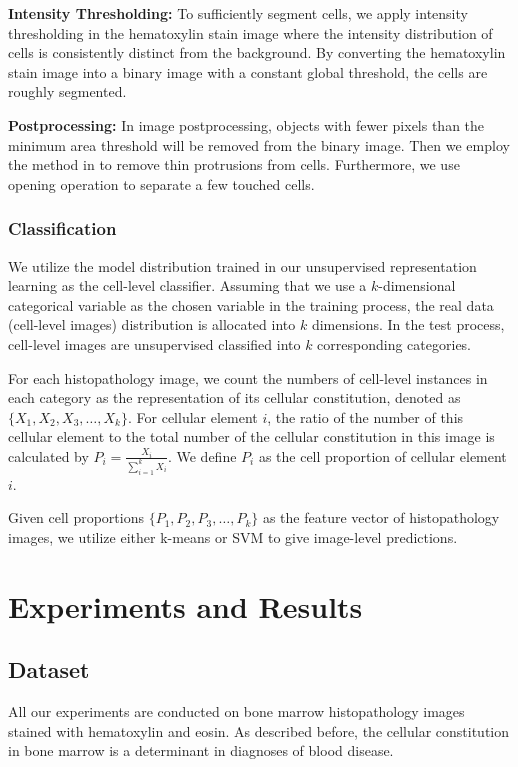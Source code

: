 \documentclass[journal]{IEEEtran}
\begin{document}
\textbf{Intensity Thresholding:} To sufficiently segment cells, we apply intensity thresholding in the hematoxylin stain image where the intensity distribution of cells is consistently distinct from the background. By converting the hematoxylin stain image into a binary image with a constant global threshold, the cells are roughly segmented.

\textbf{Postprocessing:} In image postprocessing, objects with fewer pixels than the minimum area threshold will be removed from the binary image. Then we employ the method in \cite{Wienert2012Detection} to remove thin protrusions from cells. Furthermore, we use opening operation to separate a few touched cells.

\subsubsection{Classification}
We utilize the model distribution trained in our unsupervised representation learning as the cell-level classifier. Assuming that we use a $k$-dimensional categorical variable as the chosen variable in the training process, the real data (cell-level images) distribution is allocated into $k$ dimensions. In the test process, cell-level images are unsupervised classified into $k$ corresponding categories.

For each histopathology image, we count the numbers of cell-level instances in each category as the representation of its cellular constitution, denoted as $\{X_1, X_2, X_3, \ldots, X_k\}$. For cellular element $i$, the ratio of the number of this cellular element to the total number of the cellular constitution in this image is calculated by $P_i=\frac{X_i}{\sum_{i=1}^{k}{X_i}}$. We define $P_i$ as the cell proportion of cellular element $i$.

Given cell proportions $\{P_1, P_2, P_3, \ldots, P_k\}$ as the feature vector of histopathology images, we utilize either k-means or SVM to give image-level predictions.

\section{Experiments and Results}

\subsection{Dataset} \label{subsection:dataset}
All our experiments are conducted on bone marrow histopathology images stained with hematoxylin and eosin. As described before, the cellular constitution in bone marrow is a determinant in diagnoses of blood disease.
\end{document}
